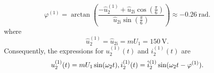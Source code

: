 \begin{solutionblock}
\begin{equation}
        \varphi^\mathrm{(1)} = \arctan(\frac{-\hat{u}^\mathrm{(1)}_\mathrm{2} + \hat{u}_{2\mathrm{i}} \cos(\frac{\pi}{6})}{\hat{u}_{2\mathrm{i}} \sin(\frac{\pi}{6})}) \approx \SI{-0.26}{\radian}.
        \label{7.1.2:eq:phase_i_2_fund}         
    \end{equation}
    where 
    \begin{equation}
        \hat{u}^\mathrm{(1)}_\mathrm{2} =  \hat{u}_{2\mathrm{i}} = m U_1 = \SI{150}{\volt}. 
        \label{7.1.2:eq:u_2_fund_ui}          
    \end{equation}
    Consequently, the expressions for $u^\mathrm{(1)}_\mathrm{2}(t)$ and $i^\mathrm{(1)}_\mathrm{2}(t)$ are
    \begin{equation}
        u^\mathrm{(1)}_\mathrm{2}(t) = m U_{\mathrm{1}} \sin(\omega_2 t),\\
        i^\mathrm{(1)}_\mathrm{2}(t) = \hat{i}^\mathrm{(1)}_\mathrm{2} \sin(\omega_2 t - \varphi^\mathrm{(1)}).
        \label{7.1.2:eq:i_u_2_fund}          
    \end{equation}
\end{solutionblock}

